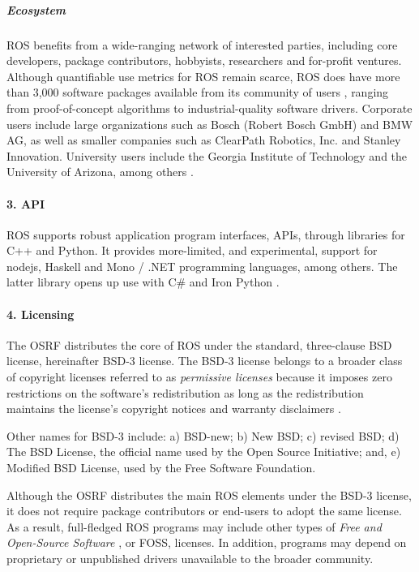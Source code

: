\documentclass[9pt,twocolumn,twoside]{../../styles/osajnl}
\begin{document}
\subparagraph{Ecosystem}
ROS benefits from a wide-ranging network of interested parties, including core developers, package contributors, hobbyists, researchers and for-profit ventures.  Although quantifiable use metrics for ROS remain scarce, ROS does have more than 3,000 software packages available from its community of users \cite{www-ros-why}, ranging from proof-of-concept algorithms to industrial-quality software drivers.  Corporate users include large organizations such as Bosch (Robert Bosch GmbH) and BMW AG, as well as smaller companies such as ClearPath Robotics, Inc. and Stanley Innovation.  University users include the Georgia Institute of Technology and the University of Arizona, among others \cite{www-ros-ecosystem}.  

\paragraph{3. API}

ROS supports robust application program interfaces, APIs, through libraries for C++ and Python.  It provides more-limited, and experimental, support for nodejs, Haskell and Mono / .NET programming languages, among others.  The latter library opens up use with C\# and Iron Python \cite{www-ros-api}.

\paragraph{4. Licensing}

The OSRF distributes the core of ROS under the standard, three-clause BSD license, hereinafter BSD-3 license.  The BSD-3 license belongs to a broader class of copyright licenses referred to as \textit{permissive licenses} because it imposes zero restrictions on the software's redistribution as long as the redistribution maintains the license's copyright notices and warranty disclaimers \cite{www-wikipedia-bsd}.

Other names for BSD-3 include: a) BSD-new; b) New BSD; c) revised BSD; d) The BSD License, the official name used by the Open Source Initiative; and, e) Modified BSD License, used by the Free Software Foundation.

Although the OSRF distributes the main ROS elements under the BSD-3 license, it does not require package contributors or end-users to adopt the same license.  As a result, full-fledged ROS programs may include other types of \textit{Free and Open-Source Software} \cite{www-wiki-foss}, or FOSS, licenses.  In addition, programs may depend on proprietary or unpublished drivers unavailable to the broader community.
\end{document}
